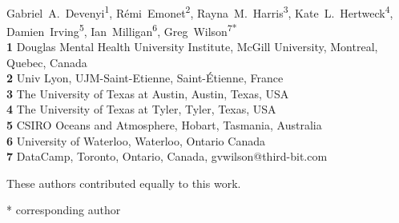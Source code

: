 \documentclass[10pt,letterpaper]{article}
\date{}
\begin{document}
\vspace*{0.2in}

\begin{flushleft}
{\Large
\textbf{} %
}
\newline
\\
{Gabriel~A.~Devenyi}\textsuperscript{1{\ddag}},
{R\'{e}mi~Emonet}\textsuperscript{2{\ddag}},
{Rayna~M.~Harris}\textsuperscript{3{\ddag}},
{Kate~L.~Hertweck}\textsuperscript{4{\ddag}},
{Damien~Irving}\textsuperscript{5{\ddag}},
{Ian~Milligan}\textsuperscript{6{\ddag}},
{Greg~Wilson}\textsuperscript{7{\ddag}*}
\\
\bigskip
\textbf{1} Douglas Mental Health University Institute, McGill University, Montreal, Quebec, Canada \\
\textbf{2} Univ Lyon, UJM-Saint-Etienne, Saint-\'{E}tienne, France \\
\textbf{3} The University of Texas at Austin, Austin, Texas, USA \\
\textbf{4} The University of Texas at Tyler, Tyler, Texas, USA \\
\textbf{5} CSIRO Oceans and Atmosphere, Hobart, Tasmania, Australia \\
\textbf{6} University of Waterloo, Waterloo, Ontario Canada \\
\textbf{7} DataCamp, Toronto, Ontario, Canada, gvwilson@third-bit.com \\

\bigskip

%
%
{\ddag} These authors contributed equally to this work.





* corresponding author

\end{flushleft}
\end{document}
